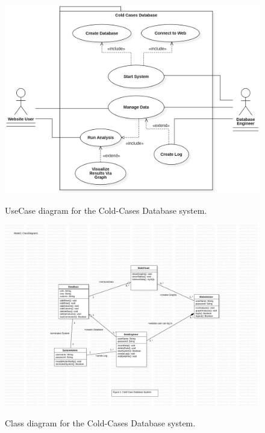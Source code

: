 \documentclass[11pt]{article}
\begin{document}
\begin{figure}[!ht]
\centering
	\includegraphics[width=.95\textwidth]{./UseCases/jardee_usecase}\\
	\caption{UseCase diagram for the Cold-Cases Database system.}
	\label{fig:usecase_diagram}
\end{figure}
\clearpage

\begin{figure}[!ht]
\centering
	\includegraphics[width=.95\textwidth]{./Class Diagrams/ColdCaseClassDiagram}\\
	\caption{Class diagram for the Cold-Cases Database system.}
	\label{fig:class_diagram}
\end{figure}
\clearpage
\end{document}
